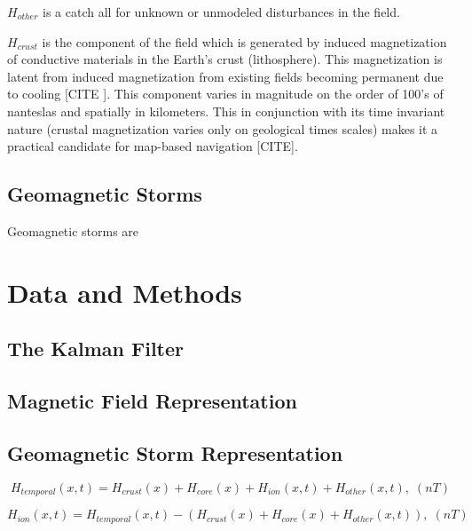\documentclass[conf]{new-aiaa}
\begin{document}
\(H_{other}\) is a catch all for unknown or unmodeled disturbances in the field.

\(H_{crust}\) is the component of the field which is generated by induced magnetization of conductive materials in the Earth's crust (lithosphere). This magnetization is latent from induced magnetization from existing fields becoming permanent due to cooling [CITE ]. This component varies in magnitude on the order of 100's of nanteslas and spatially in kilometers. This in conjunction with its time invariant nature (crustal magnetization varies only on geological times scales) makes it a practical candidate for map-based navigation [CITE].  

\subsection{Geomagnetic Storms} %

Geomagnetic storms are 

\section{Data and Methods} %

\subsection{The Kalman Filter} %

\subsection{Magnetic Field Representation} %

\subsection{Geomagnetic Storm Representation} %

\begin{equation}
    H_{temporal}(x, t) = H_{crust}(x) + H_{core}(x) + H_{ion}(x, t) + H_{other}(x, t), \; (nT)
\end{equation}

\begin{equation}
    H_{ion}(x, t) = H_{temporal}(x, t) - (H_{crust}(x) + H_{core}(x) + H_{other}(x, t)), \; (nT)
\end{equation}
\end{document}
